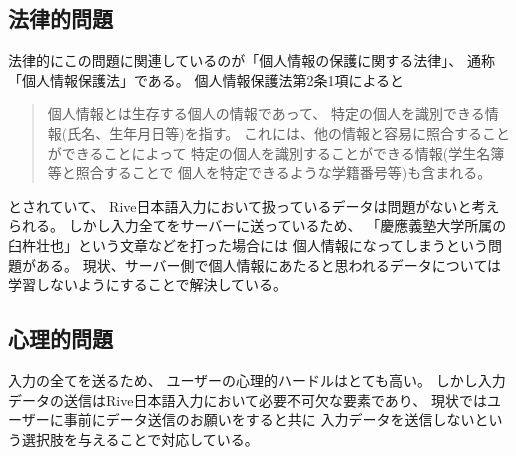 \subsection{法律的問題}
法律的にこの問題に関連しているのが「個人情報の保護に関する法律」、
通称「個人情報保護法」である。
個人情報保護法第2条1項によると
\begin{quotation}
  個人情報とは生存する個人の情報であって、
  特定の個人を識別できる情報(氏名、生年月日等)を指す。
  これには、他の情報と容易に照合することができることによって
  特定の個人を識別することができる情報(学生名簿等と照合することで
  個人を特定できるような学籍番号等)も含まれる。
\end{quotation}
とされていて、
Rive日本語入力において扱っているデータは問題がないと考えられる。
しかし入力全てをサーバーに送っているため、
「慶應義塾大学所属の臼杵壮也」という文章などを打った場合には
個人情報になってしまうという問題がある。
現状、サーバー側で個人情報にあたると思われるデータについては
学習しないようにすることで解決している。

\subsection{心理的問題}
入力の全てを送るため、
ユーザーの心理的ハードルはとても高い。
しかし入力データの送信はRive日本語入力において必要不可欠な要素であり、
現状ではユーザーに事前にデータ送信のお願いをすると共に
入力データを送信しないという選択肢を与えることで対応している。

